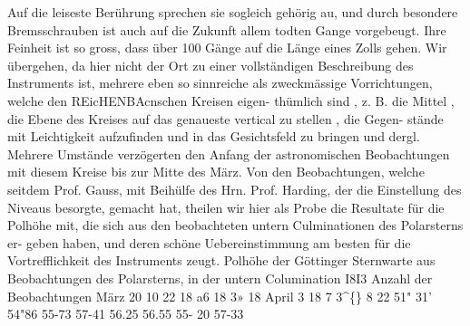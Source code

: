 \documentclass[12pt,a4paper]{article}
\begin{document}
Auf  die  leiseste  Berührung  sprechen  sie  sogleich  gehörig  au,  und  durch  besondere  Bremsschrauben  ist 
auch  auf  die  Zukunft  allem  todten  Gange  vorgebeugt.  Ihre  Feinheit  ist  so  gross,  dass  über  100  Gänge 
auf  die  Länge  eines  Zolls  gehen. 
Wir  übergehen,  da  hier  nicht  der  Ort  zu  einer  vollständigen  Beschreibung  des  Instruments  ist, 
mehrere  eben  so  sinnreiche  als  zweckmässige  Vorrichtungen,  welche  den  REicHENBAcnschen  Kreisen  eigen- 
thümlich  sind ,  z.  B.  die  Mittel ,  die  Ebene  des  Kreises  auf  das  genaueste  vertical  zu  stellen ,  die  Gegen- 
stände mit  Leichtigkeit  aufzufinden  und  in  das  Gesichtsfeld  zu  bringen  und  dergl. 
Mehrere  Umstände  verzögerten  den  Anfang  der  astronomischen  Beobachtungen  mit  diesem  Kreise 
bis  zur  Mitte  des  März.  Von  den  Beobachtungen,  welche  seitdem  Prof.  Gauss,  mit  Beihülfe  des  Hrn. 
Prof.  Harding,  der  die  Einstellung  des  Niveaus  besorgte,  gemacht  hat,  theilen  wir  hier  als  Probe  die 
Resultate  für  die  Polhöhe  mit,  die  sich  aus  den  beobachteten  untern  Culminationen  des  Polarsterns  er- 
geben haben,  und  deren  schöne  Uebereinstimmung  am  besten  für  die  Vortrefflichkeit  des  Instruments  zeugt. 
Polhöhe  der  Göttinger  Sternwarte  aus  Beobachtungen  des  Polarsterns,  in  der  untern  Columination 
I8I3 
Anzahl  der 
Beobachtungen 
März    20 
10 
22 
18 
a6 
18 
3» 
18 
April     3 
18 
7 
3\textasciicircum\{\} 
8 
22 
51"  31' 
54"86 
55-73 
57-41 
56.25 
56.55 
55- 20 
57-33 
\end{document}
